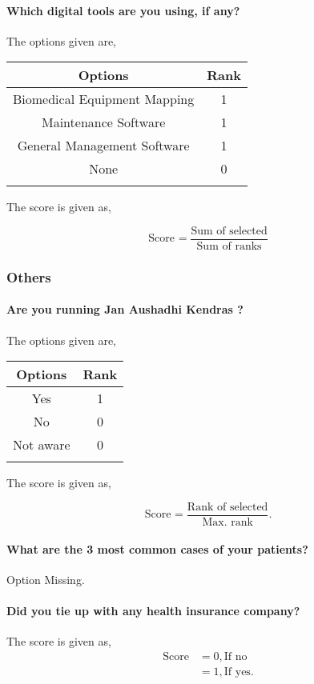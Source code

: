 \documentclass[oneside]{article}
\newcommand{\tsub}[2]{\text{#1}_{\text{#2}}}
\newcommand{\dsub}[2]{\dfrac{\text{#1}}{\text{#2}}}
\newcommand{\multsel}[1]
{
	\[
		\tsub{Score}{#1} = \dsub{Sum of selected}{Sum of ranks}
	\]
}
\newcommand{\singsel}[1]
{
	\[
		\tsub{Score}{#1} = \dsub{Rank of selected}{Max. rank}.
	\]
}
\newenvironment{ttable}
{
\begin{center}
\begin{tabular}{c|c}
\hline
}
{
\\ \hline
\end{tabular}
\end{center}
}
\begin{document}
\paragraph{ Which digital tools are you using, if any?}
The options given are,
\begin{ttable}
Options & Rank \\ \hline
Biomedical Equipment Mapping & 1 \\
Maintenance Software & 1 \\
General Management Software & 1 \\
None & 0 \\
\hline
\end{ttable}
The score is given as,
\multsel{}
\subsubsection{Others}

\paragraph{ Are you running Jan Aushadhi Kendras ?}
The options given are,
\begin{ttable}
Options & Rank \\ \hline
Yes & 1 \\
No & 0 \\
Not aware & 0 \\
\hline
\end{ttable}
The score is given as,
\singsel{}
\paragraph{ What are the 3 most common cases of your patients?}
Option Missing.
\paragraph{ Did you tie up with any health insurance company?}

The score is given as,
\begin{align*}
\tsub{Score}{} &= 0, \text{If no} \\
        &= 1, \text{If yes}.
\end{align*}
\end{document}
